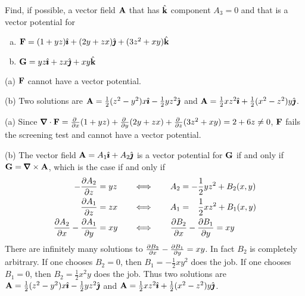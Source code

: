 \begin{question}
Find, if possible, a vector field $\mathbf{A}$ that has $\hat{\mathbf{k}}$ 
component $A_3=0$ and that is a vector potential for 
\begin{enumerate}[(a)]
\item $\mathbf{F}=(1+yz)\hat{\pmb{\imath}}+(2y+zx)\hat{\pmb{\jmath}}+(3z^2+xy)\hat{\mathbf{k}}$
\item $\mathbf{G}= yz\hat{\pmb{\imath}}+zx\hat{\pmb{\jmath}}+xy\hat{\mathbf{k}}$
\end{enumerate}
\end{question}


\begin{answer} 
(a) $\mathbf{F}$ cannot have a vector potential.

(b) Two solutions are
$\mathbf{A}=\frac{1}{2}(z^2-y^2)x\hat{\pmb{\imath}}-\frac{1}{2} yz^2\hat{\pmb{\jmath}}$ and 
$\mathbf{A}=\frac{1}{2} xz^2\hat{\pmb{\imath}}+\frac{1}{2}(x^2-z^2)y\hat{\pmb{\jmath}}$.

\end{answer}

\begin{solution} 
(a) Since 
$\vnabla\cdot\vF
=\pdiff{}{x}(1+yz)+\pdiff{}{y}(2y+zx)+\pdiff{}{z}(3z^2+xy)=2+6z\ne 0$, 
$\mathbf{F}$ fails the screening test and cannot have a vector potential.

(b) The vector field $\mathbf{A}=A_1\hat{\pmb{\imath}}+A_2\hat{\pmb{\jmath}}$ is a vector
potential for $\mathbf{G}$ if and only if $\vG=\vnabla\times\vA$,
which is the case if and only if
\begin{alignat*}{3}
-\pdiff{A_2}{z}&= yz\quad &
      \iff&\quad&     
      &A_2=-\frac{1}{2} yz^2+B_2(x,y)\\
\pdiff{A_1}{z}&=zx &
       \iff&\quad &  
      &A_1=\phantom{-}\frac{1}{2} xz^2+B_1(x,y)\\
\pdiff{A_2}{x}-\pdiff{A_1}{y} &=xy &
     \iff& &  & 
   \pdiff{B_2}{x} -\pdiff{B_1}{y}=xy
\end{alignat*}
There are infinitely many solutions to $\pdiff{B_2}{x}
-\pdiff{B_1}{y}=xy$. In fact $B_2$ is completely arbitrary.
If one chooses $B_2=0$, then $B_1=-\frac{1}{2} xy^2$ does the job. If one chooses
$B_1=0$, then $B_2=\frac{1}{2} x^2y$ does the job. Thus two solutions are
$\mathbf{A}=\frac{1}{2}(z^2-y^2)x\hat{\pmb{\imath}}-\frac{1}{2} yz^2\hat{\pmb{\jmath}}$ and 
$\mathbf{A}=\frac{1}{2} xz^2\hat{\pmb{\imath}}+\frac{1}{2}(x^2-z^2)y\hat{\pmb{\jmath}}$.
\end{solution}




\subsection*{\Application}

